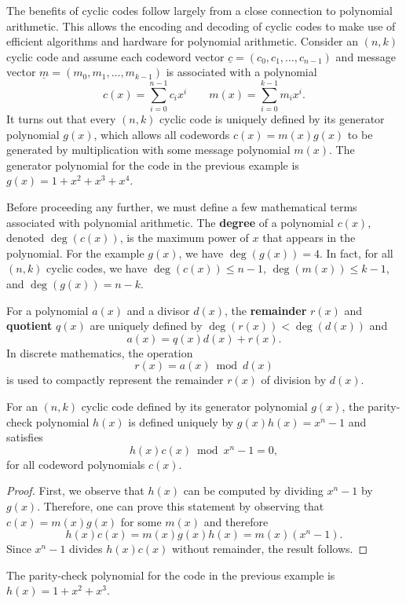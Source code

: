 The benefits of cyclic codes follow largely from a close connection to polynomial arithmetic.
This allows the encoding and decoding of cyclic codes to make use of efficient algorithms and hardware for polynomial arithmetic.
Consider an $(n,k)$ cyclic code and assume each codeword vector $\underline{c}=(c_0,c_1,\ldots,c_{n-1})$ and message vector $\underline{m}=(m_0,m_1,\ldots,m_{k-1})$ is associated with a polynomial
\[ c(x) = \sum_{i=0}^{n-1} c_i x^i \quad \quad  m(x) = \sum_{i=0}^{k-1} m_i x^i. \]
It turns out that every $(n,k)$ cyclic code is uniquely defined by its generator polynomial $g(x)$, which allows all codewords $c(x)=m(x)g(x)$ to be generated by multiplication with some message polynomial $m(x)$.
The generator polynomial for the code in the previous example is $g(x) = 1 + x^2 + x^3 + x^4$.

Before proceeding any further, we must define a few mathematical terms associated with polynomial arithmetic.
The \textbf{degree} of a polynomial $c(x)$, denoted $\deg\left( c(x) \right)$, is the maximum power of $x$ that appears in the polynomial.
For the example $g(x)$, we have $\deg \left( g(x) \right) = 4$.
In fact, for all $(n,k)$ cyclic codes, we have
$\deg \left( c(x) \right) \leq n-1$,
$\deg \left( m(x) \right) \leq k-1$, and
$\deg \left( g(x) \right) = n-k$.

For a polynomial $a(x)$ and a divisor $d(x)$, the \textbf{remainder} $r(x)$ and \textbf{quotient} $q(x)$  are uniquely defined by $\deg\left( r(x) \right) < \deg \left(d(x) \right)$ and
\[ a(x) = q(x) d(x) + r(x). \]
In discrete mathematics, the  operation
\[ r(x) = a(x) \bmod d(x) \]
is used to compactly represent the remainder $r(x)$ of division by $d(x)$.
\begin{proposition}
For an $(n,k)$ cyclic code defined by its generator polynomial $g(x)$, the parity-check polynomial $h(x)$ is defined uniquely by $g(x)h(x)=x^n - 1$ and satisfies
\[ h(x)c(x) \bmod x^n - 1 = 0, \]
for all codeword polynomials $c(x)$.
\end{proposition}
\begin{proof}
First, we observe that $h(x)$ can be computed by dividing $x^n -1$ by $g(x)$.
Therefore, one can prove this statement by observing that $c(x)=m(x)g(x)$ for some $m(x)$ and therefore
\[ h(x)c(x) = m(x)g(x)h(x) = m(x)(x^n - 1). \]
Since $x^n -1$ divides $h(x)c(x)$ without remainder, the result follows.
\end{proof}
The parity-check polynomial for the code in the previous example is $h(x) = 1 + x^2 + x^3$.

